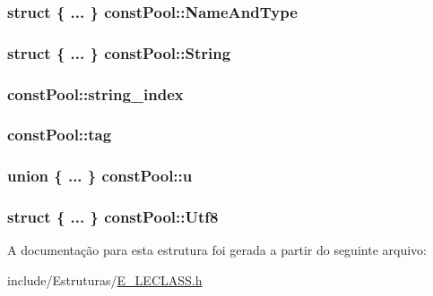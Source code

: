 \subsubsection[{Name\+And\+Type}]{\setlength{\rightskip}{0pt plus 5cm}struct \{ ... \}   const\+Pool\+::\+Name\+And\+Type}\label{structconst_pool_a727268ed0e1405a5eaab1aa5ad3cba74}
\hypertarget{structconst_pool_ab014bc483e8b8803ecf0c288495b5a5e}{}
\subsubsection[{String}]{\setlength{\rightskip}{0pt plus 5cm}struct \{ ... \}   const\+Pool\+::\+String}\label{structconst_pool_ab014bc483e8b8803ecf0c288495b5a5e}
\hypertarget{structconst_pool_a1bb9e94f3cb54a3e19bde3d251379ac0}{}
\subsubsection[{string\+\_\+index}]{ const\+Pool\+::string\+\_\+index}\label{structconst_pool_a1bb9e94f3cb54a3e19bde3d251379ac0}
\hypertarget{structconst_pool_a876197bb013e214c071ab56d1de8ed25}{}
\subsubsection[{tag}]{ const\+Pool\+::tag}\label{structconst_pool_a876197bb013e214c071ab56d1de8ed25}
\hypertarget{structconst_pool_ab327fbd2fec182d523b180c4d941d7f5}{}
\subsubsection[{u}]{\setlength{\rightskip}{0pt plus 5cm}union \{ ... \}   const\+Pool\+::u}\label{structconst_pool_ab327fbd2fec182d523b180c4d941d7f5}
\hypertarget{structconst_pool_ab18ebde1a84b99d3dc0b70b1df46be82}{}
\subsubsection[{Utf8}]{\setlength{\rightskip}{0pt plus 5cm}struct \{ ... \}   const\+Pool\+::\+Utf8}\label{structconst_pool_ab18ebde1a84b99d3dc0b70b1df46be82}


A documentação para esta estrutura foi gerada a partir do seguinte arquivo\+:\begin{DoxyCompactItemize}
\item 
include/\+Estruturas/\hyperlink{_e___l_e_c_l_a_s_s_8h}{E\+\_\+\+L\+E\+C\+L\+A\+S\+S.\+h}\end{DoxyCompactItemize}
